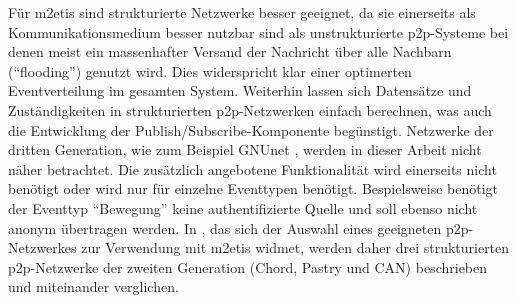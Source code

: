 Für \ac{m2etis} sind strukturierte Netzwerke besser geeignet, da sie einerseits als Kommunikationsmedium besser nutzbar sind als unstrukturierte p2p-Systeme bei denen meist ein massenhafter Versand der Nachricht über alle Nachbarn (\enquote{flooding}) genutzt wird. Dies widerspricht klar einer optimerten Eventverteilung im gesamten System. Weiterhin lassen sich Datensätze und Zuständigkeiten in strukturierten p2p-Netzwerken einfach berechnen, was auch die Entwicklung der Publish/Subscribe-Komponente begünstigt. Netzwerke der dritten Generation, wie zum Beispiel GNUnet \cite{Bennett2002GNet}, werden in dieser Arbeit nicht näher betrachtet. Die zusätzlich angebotene Funktionalität wird einerseits nicht benötigt oder wird nur für einzelne Eventtypen benötigt. Bespielsweise benötigt der Eventtyp \enquote{Bewegung} keine authentifizierte Quelle und soll ebenso nicht anonym übertragen werden. In , das sich der Auswahl eines geeigneten p2p-Netzwerkes zur Verwendung mit \ac{m2etis} widmet, werden daher drei strukturierten \ac{p2p}-Netzwerke der zweiten Generation (Chord, Pastry und CAN) beschrieben und miteinander verglichen.


